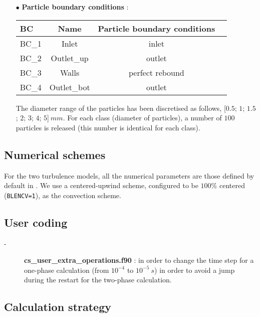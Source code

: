 \begin{itemize}
\item[$\bullet$] \textbf{Particle boundary conditions} :
%
\begin{table}[H]
   \begin{center}
      \begin{tabular}{lccc}
         \hline\hline
            BC & Name & Particle boundary conditions           \\      
         \hline
         BC\_1 & Inlet 	& inlet \\
         BC\_2 & Outlet\_up 	& outlet \\
         BC\_3 & Walls		& perfect rebound \\
         BC\_4 & Outlet\_bot 	& outlet \\
         \hline\hline
      \end{tabular}
   \end{center}
\end{table}

The diameter range of the particles has been discretised as follows, [$0.5$; $1$; $1.5$; $2$; $3$; $4$; $5$]$~mm$.
For each class (diameter of particles), a number of $100$ particles is released (this number is identical for each
class).

\end{itemize}

\subsection{Numerical schemes}

For the two turbulence models, all the numerical parameters are those defined by default
in \CS. We use a centered-upwind scheme, configured to be $100\%$ centered (\texttt{BLENCV=1}), as the convection scheme.

\subsection{User coding}

\begin{description}

   \item[-] \textbf{cs\_user\_extra\_operations.f90} : in order to change the time step for a one-phase calculation (from $10^{-4}$ to $10^{-5}~s$) in order to avoid a jump during the restart for the two-phase calculation.

\end{description}

\subsection{Calculation strategy}

